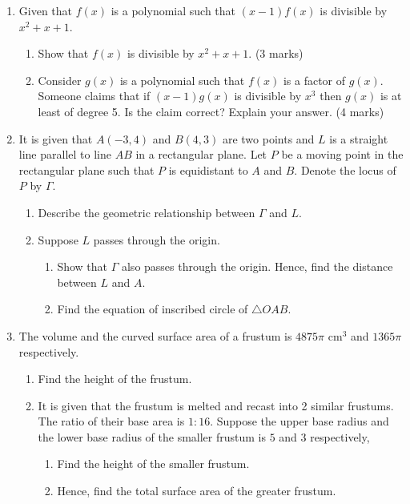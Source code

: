 \documentclass[12pt]{article}
\begin{document}
\begin{enumerate}
        \item Given that $f(x)$ is a polynomial such that $(x-1)f(x)$ is divisible by $x^2+x+1$.\begin{enumerate}
            \item Show that $f(x)$ is divisible by $x^2+x+1$. \hfill (3 marks)
            \item Consider $g(x)$ is a polynomial such that $f(x)$ is a factor of $g(x)$. Someone claims that if $(x-1)g(x)$ is divisible by $x^3$ then $g(x)$ is at least of degree 5. Is the claim correct? Explain your answer. \hfill (4 marks)
        \end{enumerate}

        \item It is given that $A(-3,4)$ and $B(4,3)$ are two points and $L$ is a straight line parallel to line $AB$ in a rectangular plane. Let $P$ be a moving point in the rectangular plane such that $P$ is equidistant to $A$ and $B$. Denote the locus of $P$ by $\Gamma$.\begin{enumerate}
            \item Describe the geometric relationship between $\Gamma$ and $L$.
            \item Suppose $L$ passes through the origin.\begin{enumerate}
                \item Show that $\Gamma$ also passes through the origin. Hence, find the distance between $L$ and $A$.
                \item Find the equation of inscribed circle of $\triangle OAB$.
            \end{enumerate}
        \end{enumerate} 

        \item The volume and the curved surface area of a frustum is $4875\pi$ cm$^3$ and $1365\pi$ respectively.\begin{enumerate}
            \item Find the height of the frustum.
            \item It is given that the frustum is melted and recast into 2 similar frustums. The ratio of their base area is $1:16$. Suppose the upper base radius and the lower base radius of the smaller frustum is $5$ and $3$ respectively,\begin{enumerate}
                \item Find the height of the smaller frustum.
                \item Hence, find the total surface area of the greater frustum.
            \end{enumerate}
        \end{enumerate} 


\end{enumerate}
\end{document}
